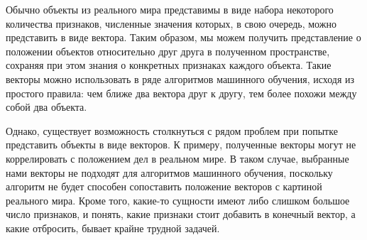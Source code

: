 \documentclass[times,specification,annotation]{itmo-student-thesis}
\begin{document}





\tableofcontents

\startprefacepage

Обычно объекты из реального мира представимы в виде набора некоторого
количества признаков, численные значения которых, в свою очередь, можно
представить в виде вектора. Таким образом, мы можем получить представление о
положении объектов относительно друг друга в полученном пространстве,
сохраняя при этом знания о конкретных признаках каждого объекта. Такие
векторы можно использовать в ряде алгоритмов машинного обучения, исходя из
простого правила: чем ближе два вектора друг к другу, тем более похожи между
собой два объекта.

Однако, существует возможность столкнуться с рядом проблем при попытке
представить объекты в виде векторов. К примеру, полученные векторы могут не
коррелировать с положением дел в реальном мире. В таком случае, выбранные
нами векторы не подходят для алгоритмов машинного обучения, поскольку
алгоритм не будет способен сопоставить положение векторов с картиной
реального мира. Кроме того, какие-то сущности имеют либо слишком большое
число признаков, и понять, какие признаки стоит добавить в конечный вектор, а
какие отбросить, бывает крайне трудной задачей.
\end{document}
